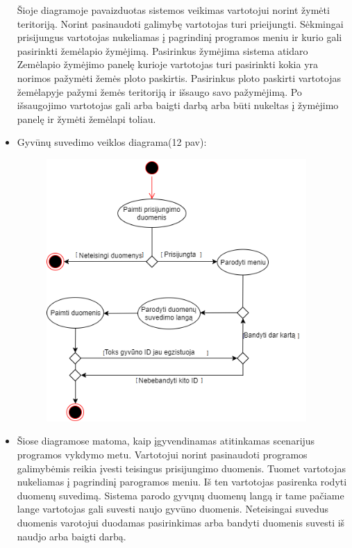 \documentclass[oneside]{VUMIFPSkursinis}
\begin{document}
\begin{itemize}
Šioje diagramoje pavaizduotas sistemos veikimas vartotojui norint žymėti teritoriją. Norint pasinaudoti galimybę vartotojas turi prieijungti. Sėkmingai prisijungus vartotojas nukeliamas į pagrindinį programos meniu ir kurio gali pasirinkti žemėlapio žymėjimą. Pasirinkus žymėjima sistema atidaro Zemėlapio žymėjimo panelę kurioje vartotojas turi pasirinkti kokia yra norimos pažymėti žemės ploto paskirtis. Pasirinkus ploto paskirti vartotojas žemėlapyje pažymi žemės teritoriją ir išsaugo savo pažymėjimą. Po išsaugojimo vartotojas gali arba baigti darbą arba būti nukeltas į žymėjimo panelę ir žymėti žemėlapi toliau.
\item Gyvūnų suvedimo veiklos diagrama(12 pav):
	\begin{figure}[H]
	\centering	
	\includegraphics[width=10cm,height=10cm,keepaspectratio]{VeiklosGyvunuSuvedimas.png}
	\caption{}
	\label{}
	\end{figure}
\item Šiose diagramose matoma, kaip įgyvendinamas atitinkamas scenarijus programos vykdymo metu. Vartotojui norint pasinaudoti programos galimybėmis reikia įvesti teisingus prisijungimo duomenis. Tuomet vartotojas nukeliamas į pagrindinį parogramos meniu. Iš ten vartotojas pasirenka rodyti duomenų suvedimą. Sistema parodo gyvųnų duomenų langą ir tame pačiame lange vartotojas gali suvesti naujo gyvūno duomenis. Neteisingai suvedus duomenis varotojui duodamas pasirinkimas arba bandyti duomenis suvesti iš naudjo arba baigti darbą.
\end{itemize}
\end{document}
